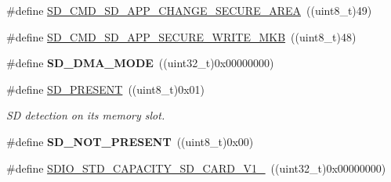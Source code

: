 \begin{DoxyCompactItemize}
\item 
\#define \hyperlink{group___s_t_m324x_g___e_v_a_l___s_d_i_o___s_d___exported___constants_ga15e57ba63b8da2bf43d0205efd532b89}{S\+D\+\_\+\+C\+M\+D\+\_\+\+S\+D\+\_\+\+A\+P\+P\+\_\+\+C\+H\+A\+N\+G\+E\+\_\+\+S\+E\+C\+U\+R\+E\+\_\+\+A\+R\+EA}~((uint8\+\_\+t)49)
\item 
\#define \hyperlink{group___s_t_m324x_g___e_v_a_l___s_d_i_o___s_d___exported___constants_ga025052e51318ae13855774c1acf04ee2}{S\+D\+\_\+\+C\+M\+D\+\_\+\+S\+D\+\_\+\+A\+P\+P\+\_\+\+S\+E\+C\+U\+R\+E\+\_\+\+W\+R\+I\+T\+E\+\_\+\+M\+KB}~((uint8\+\_\+t)48)
\item 
\#define {\bfseries S\+D\+\_\+\+D\+M\+A\+\_\+\+M\+O\+DE}~((uint32\+\_\+t)0x00000000)\hypertarget{group___s_t_m324x_g___e_v_a_l___s_d_i_o___s_d___exported___constants_gad3f9516a5e6764baf2083f76f4bc0eea}{}\label{group___s_t_m324x_g___e_v_a_l___s_d_i_o___s_d___exported___constants_gad3f9516a5e6764baf2083f76f4bc0eea}

\item 
\#define \hyperlink{group___s_t_m324x_g___e_v_a_l___s_d_i_o___s_d___exported___constants_ga44beec2a536fb750d2401d7bb7c227b6}{S\+D\+\_\+\+P\+R\+E\+S\+E\+NT}~((uint8\+\_\+t)0x01)\hypertarget{group___s_t_m324x_g___e_v_a_l___s_d_i_o___s_d___exported___constants_ga44beec2a536fb750d2401d7bb7c227b6}{}\label{group___s_t_m324x_g___e_v_a_l___s_d_i_o___s_d___exported___constants_ga44beec2a536fb750d2401d7bb7c227b6}

\begin{DoxyCompactList}\small\item\em SD detection on its memory slot. \end{DoxyCompactList}\item 
\#define {\bfseries S\+D\+\_\+\+N\+O\+T\+\_\+\+P\+R\+E\+S\+E\+NT}~((uint8\+\_\+t)0x00)\hypertarget{group___s_t_m324x_g___e_v_a_l___s_d_i_o___s_d___exported___constants_ga342b72a630b1c5c90e2fd95c93dd686b}{}\label{group___s_t_m324x_g___e_v_a_l___s_d_i_o___s_d___exported___constants_ga342b72a630b1c5c90e2fd95c93dd686b}

\item 
\#define \hyperlink{group___s_t_m324x_g___e_v_a_l___s_d_i_o___s_d___exported___constants_gaa713e311ddfaf2265d1ba673543a32b2}{S\+D\+I\+O\+\_\+\+S\+T\+D\+\_\+\+C\+A\+P\+A\+C\+I\+T\+Y\+\_\+\+S\+D\+\_\+\+C\+A\+R\+D\+\_\+\+V1\+\_}~((uint32\+\_\+t)0x00000000)\hypertarget{group___s_t_m324x_g___e_v_a_l___s_d_i_o___s_d___exported___constants_gaa713e311ddfaf2265d1ba673543a32b2}{}\label{group___s_t_m324x_g___e_v_a_l___s_d_i_o___s_d___exported___constants_gaa713e311ddfaf2265d1ba673543a32b2}


\end{DoxyCompactItemize}
